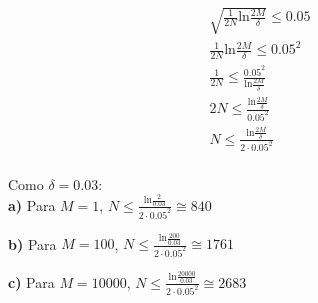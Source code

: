 \documentclass[12pt,letterpaper]{article}
\begin{document}
	\begin{multicols}{2}
		\begin{equation*}
			\begin{split}
				\sqrt{\frac{1}{2N} \text{ln} \frac{2M}{\delta}} \leq 0.05 \\
				\frac{1}{2N} \text{ln} \frac{2M}{\delta} \leq 0.05^2 \\
				\frac{1}{2N} \leq \frac{0.05^2}{\text{ln} \frac{2M}{\delta}} \\
				2N \leq \frac{\text{ln} \frac{2M}{\delta}}{0.05^2} \\
				N \leq \frac{\text{ln} \frac{2M}{\delta}}{2 \cdot 0.05^2} \\
			\end{split}
		\end{equation*}
		
		Como $\delta = 0.03$: \\
		
		\textbf{a)} Para $M = 1$, $N \leq \frac{\text{ln} \frac{2}{0.03}}{2 \cdot 0.05^2} \cong 840$
		
		\textbf{b)} Para $M = 100$, $N \leq \frac{\text{ln} \frac{200}{0.03}}{2 \cdot 0.05^2} \cong 1761$
		
		\textbf{c)} Para $M = 10000$, $N \leq \frac{\text{ln} \frac{20000}{0.03}}{2 \cdot 0.05^2} \cong 2683$
		
	\end{multicols}
	
	
	
\end{document}
